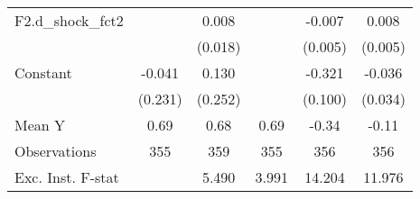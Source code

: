 {\begin{tabular}{l*{5}{c}}
\addlinespace
F2.d\_shock\_fct2     &                     &       0.008         &                     &      -0.007         &       0.008         \\
                    &                     &     (0.018)         &                     &     (0.005)         &     (0.005)         \\
\addlinespace
Constant            &      -0.041         &       0.130         &                     &      -0.321\sym{***}&      -0.036         \\
                    &     (0.231)         &     (0.252)         &                     &     (0.100)         &     (0.034)         \\
\midrule
Mean Y              &        0.69         &        0.68         &        0.69         &       -0.34         &       -0.11         \\
Observations        &         355         &         359         &         355         &         356         &         356         \\
Exc. Inst. F-stat   &                     &       5.490         &       3.991         &      14.204         &      11.976         \\
\bottomrule
\end{tabular}
}
